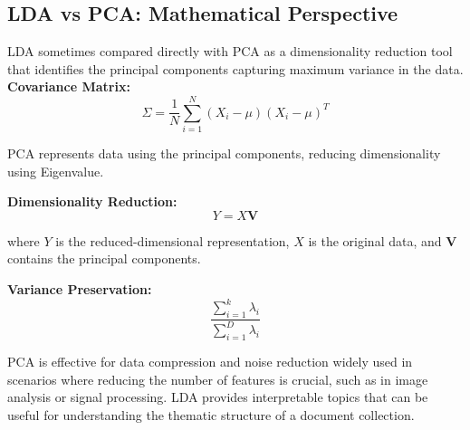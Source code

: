 \documentclass[sn-mathphys,Numbered]{sn-jnl}%
\theoremstyle{thmstyleone}%
\theoremstyle{thmstyletwo}%
\theoremstyle{thmstylethree}%
\begin{document}
\subsection*{LDA vs PCA: Mathematical Perspective}
LDA sometimes compared directly with PCA as a dimensionality reduction tool that identifies the principal components capturing maximum variance in the data.
\textbf{Covariance Matrix:}
\begin{equation}
    \Sigma = \frac{1}{N}\sum_{i=1}^{N}(X_i - \mu)(X_i - \mu)^T
\end{equation}

PCA represents data using the principal components, reducing dimensionality using Eigenvalue.

\textbf{Dimensionality Reduction:}
\begin{equation}
    Y = X \bm{V}
\end{equation}

where \(Y\) is the reduced-dimensional representation, \(X\) is the original data, and \(\bm{V}\) contains the principal components.

\textbf{Variance Preservation:}
\begin{equation}
    \frac{\sum_{i=1}^{k}\lambda_i}{\sum_{i=1}^{D}\lambda_i}
\end{equation}

PCA is effective for data compression and noise reduction widely used in scenarios where reducing the number of features is crucial, such as in image analysis or signal processing. LDA provides interpretable topics that can be useful for understanding the thematic structure of a document collection.
\end{document}
